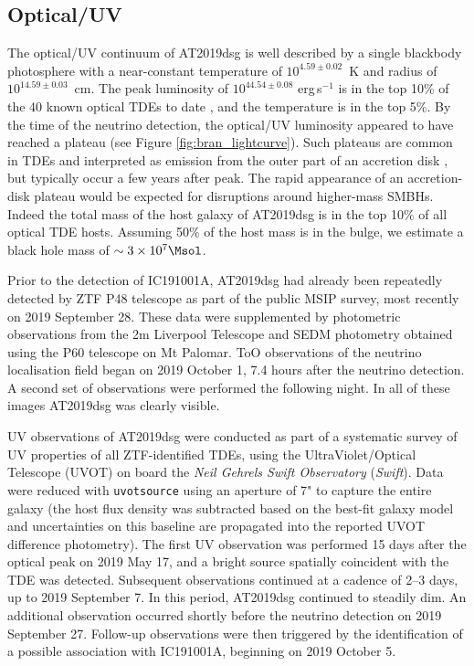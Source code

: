 \subsection{Optical/UV}

 The optical/UV continuum of AT2019dsg is well described by a single blackbody photosphere with a near-constant temperature \cite{2020arXiv200101409V} of $10^{4.59 \pm 0.02}$~K and radius of $10^{14.59 \pm 0.03}$~cm. The peak luminosity of $10^{44.54 \pm 0.08}$ erg\,s$^{-1}$ is in the top 10\% of the 40 known optical TDEs to date \cite{2020arXiv200101409V}, and the temperature is in the top 5\%. By the time of the neutrino detection, the optical/UV luminosity appeared to have reached a plateau (see Figure \ref{fig:bran_lightcurve}). Such plateaus are common in TDEs and interpreted as emission from the outer part of an accretion disk \cite{2019ApJ...878...82V,2020MNRAS.492.5655M}, but typically occur a few years after peak. The rapid appearance of an accretion-disk plateau would be expected for disruptions around higher-mass SMBHs. Indeed the total mass of the host galaxy of AT2019dsg is in the top 10$\%$ of all optical TDE hosts. Assuming 50$\%$ of the host mass is in the bulge, we estimate \cite{2013ApJ...764..184M} a black
hole mass of $\sim 3 \times 10^{7} \Msol$.

Prior to the detection of IC191001A, AT2019dsg had already been repeatedly detected by ZTF P48 telescope as part of the public MSIP survey, most recently on 2019 September 28. These data were supplemented by photometric observations from the 2m Liverpool Telescope\cite{2004SPIE.5489..679S} and SEDM\cite{Blagorodnova18,Rigault19} photometry\cite{fst+2016} obtained using the P60 telescope on Mt Palomar. ToO observations of the neutrino localisation field began on 2019 October 1, 7.4 hours after the neutrino detection. A second set of observations were performed the following night. In all of these images AT2019dsg was clearly visible. 

UV observations of AT2019dsg were conducted as part of a systematic survey of UV properties of all ZTF-identified TDEs\cite{2018ApJ...852...72V}, using the UltraViolet/Optical Telescope\cite{2005SSRv..120...95R} (UVOT) on board the \textit{Neil Gehrels Swift Observatory} (\textit{Swift})\cite{2004ApJ...611.1005G}. Data were reduced with \texttt{uvotsource} using an aperture of 7" to capture the entire galaxy (the host flux density was subtracted based on the best-fit galaxy model\cite{2018ApJ...852...72V} and uncertainties on this baseline are propagated into the reported UVOT difference photometry). The first UV observation was performed 15 days after the optical peak on 2019 May 17, and a bright source spatially coincident with the TDE was detected. Subsequent observations continued at a cadence of 2--3 days, up to 2019 September 7. In this period, AT2019dsg continued to steadily dim. An additional observation occurred shortly before the neutrino detection on 2019 September 27. Follow-up observations were then triggered by the identification of a possible association with IC191001A\cite{2019ATel13160....1S}, beginning on 2019 October 5. 

